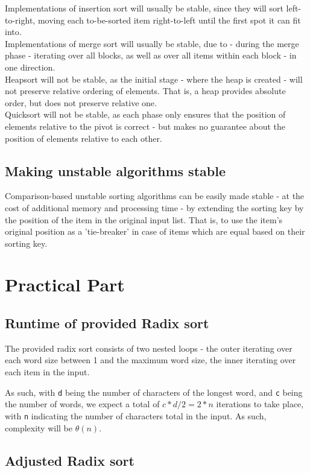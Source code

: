 \documentclass[a4paper]{scrartcl}
\begin{document}
Implementations of insertion sort will usually be stable, since they will sort
left-to-right, moving each to-be-sorted item right-to-left until the first spot
it can fit into.
\\ 
Implementations of merge sort will usually be stable, due to - during the
merge phase - iterating over all blocks, as well as over all items within each
block - in one direction.
\\
Heapsort will not be stable, as the initial stage - where the heap is created -
will not preserve relative ordering of elements. That is, a heap provides
absolute order, but does not preserve relative one.
\\
Quicksort will not be stable, as each phase only ensures that the position of
elements relative to the pivot is correct - but makes no guarantee about the
position of elements relative to each other.

\subsection{Making unstable algorithms stable}

Comparison-based unstable sorting algorithms can be easily made stable - at the
cost of additional memory and processing time - by extending the sorting key by
the position of the item in the original input list. That is, to use the item's
original position as a 'tie-breaker' in case of items which are equal based on
their sorting key.


\section{Practical Part}

\subsection{Runtime of provided Radix sort}

The provided radix sort consists of two nested loops - the outer iterating over
each word size between 1 and the maximum word size, the inner iterating over
each item in the input.

As such, with \texttt{d} being the number of characters of the longest word,
and \texttt{c} being the number of words, we expect a total of $c * d/2 = 2*n$
iterations to take place, with \texttt{n} indicating the number of characters
total in the input. As such, complexity will be $\theta(n)$.

\subsection{Adjusted Radix sort}
\end{document}
